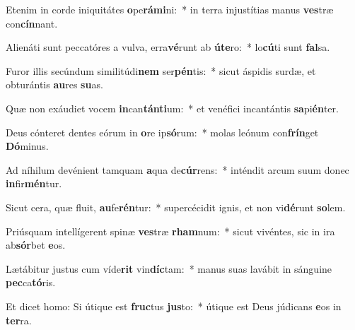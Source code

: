\item Etenim in corde iniquitátes \textbf{o}pe\textbf{rá}\textbf{mi}ni:~* in terra injustítias manus \textbf{ves}træ con\textbf{cín}nant.
\item Alienáti sunt peccatóres a vulva, erra\textbf{vé}runt ab \textbf{ú}\textbf{te}ro:~* lo\textbf{cú}ti sunt \textbf{fal}sa.
\item Furor illis secúndum similitúdi\textbf{nem} ser\textbf{pén}tis:~* sicut áspidis surdæ, et obturántis \textbf{au}res \textbf{su}as.
\item Quæ non exáudiet vocem \textbf{in}can\textbf{tán}\textbf{ti}um:~* et venéfici incantántis \textbf{sa}pi\textbf{én}ter.
\item Deus cónteret dentes eórum in \textbf{o}re ip\textbf{só}rum:~* molas leónum con\textbf{frín}get \textbf{Dó}minus.
\item Ad níhilum devénient tamquam \textbf{a}qua de\textbf{cúr}rens:~* inténdit arcum suum donec \textbf{in}fir\textbf{mén}tur.
\item Sicut cera, quæ fluit, \textbf{au}fe\textbf{rén}tur:~* supercécidit ignis, et non vi\textbf{dé}runt \textbf{so}lem.
\item Priúsquam intellígerent spinæ \textbf{ves}træ \textbf{rham}num:~* sicut vivéntes, sic in ira ab\textbf{sór}bet \textbf{e}os.
\item Lætábitur justus cum víde\textbf{rit} vin\textbf{díc}tam:~* manus suas lavábit in sánguine \textbf{pec}ca\textbf{tó}ris.
\item Et dicet homo: Si útique est \textbf{fruc}tus \textbf{jus}to:~* útique est Deus júdicans \textbf{e}os in \textbf{ter}ra.
